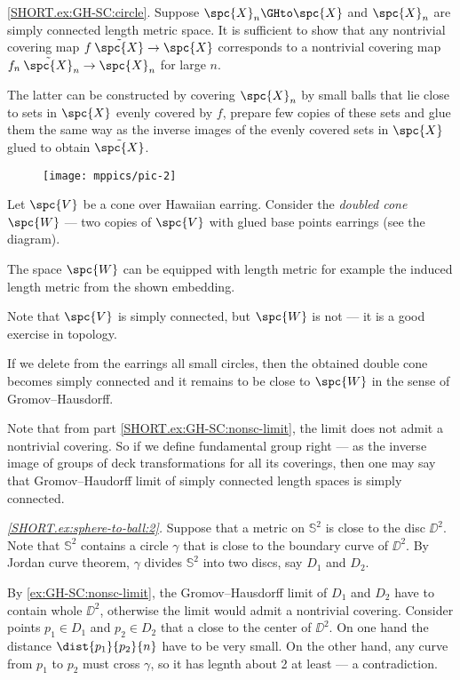  \ref{SHORT.ex:GH-SC:circle}.
Suppose $\spc{X}_n\GHto \spc{X}$ and $\spc{X}_n$ are simply connected length metric space.
It is sufficient to show that any nontrivial covering map $f\:\tilde{\spc{X}}\to \spc{X}$ corresponds to a nontrivial covering map $f_n\:\tilde{\spc{X}}_n\to \spc{X}_n$ for large $n$.

The latter can be constructed by covering $\spc{X}_n$ by small balls that lie close to sets in $\spc{X}$ evenly covered by $f$, prepare few copies of these sets and glue them the same way as the inverse images of the evenly covered sets in $\spc{X}$ glued to obtain $\tilde{\spc{X}}$. %

\begin{wrapfigure}{r}{40 mm}
\vskip-0mm
\centering
\texttt{[image: mppics/pic-2]}
\end{wrapfigure}

Let $\spc{V}$ be a cone over Hawaiian earring.
Consider the \emph{doubled cone} $\spc{W}$ --- two copies of $\spc{V}$ with glued base points earrings (see the diagram).

The space $\spc{W}$ can be equipped with length metric for example the induced length metric from the shown embedding.

Note that $\spc{V}$ is simply connected, but $\spc{W}$ is not --- it is a good exercise in topology.

If we delete from the earrings all small circles, then the obtained double cone becomes simply connected and it remains to be close to $\spc{W}$ in the sense of Gromov--Hausdorff.

Note that from part \ref{SHORT.ex:GH-SC:nonsc-limit}, the limit does not admit a nontrivial covering.
So if we define fundamental group right --- as the inverse image of groups of deck transformations for all its coverings, then one may say that Gromov--Haudorff limit of simply connected length spaces is simply connected.

\textit{\ref{SHORT.ex:sphere-to-ball:2}.}
Suppose that a metric on $\mathbb{S}^2$ is close to the disc $\DD^2$.
Note that $\mathbb{S}^2$ contains a circle $\gamma$ that is close to the boundary curve of $\DD^2$.
By Jordan curve theorem, $\gamma$ divides $\mathbb{S}^2$ into two discs, say $D_1$ and $D_2$.

By \ref{ex:GH-SC:nonsc-limit}, the Gromov--Hausdorff limit of $D_1$ and $D_2$ have to contain whole $\DD^2$, otherwise the limit would admit a nontrivial covering.
Consider points $p_1\in D_1$ and $p_2\in D_2$ that a close to the center of $\DD^2$.
On one hand the distance $\dist{p_1}{p_2}{n}$ have to be very small.
On the other hand, any curve from $p_1$ to $p_2$ must cross $\gamma$, so it has legnth about 2 at least --- a contradiction.



